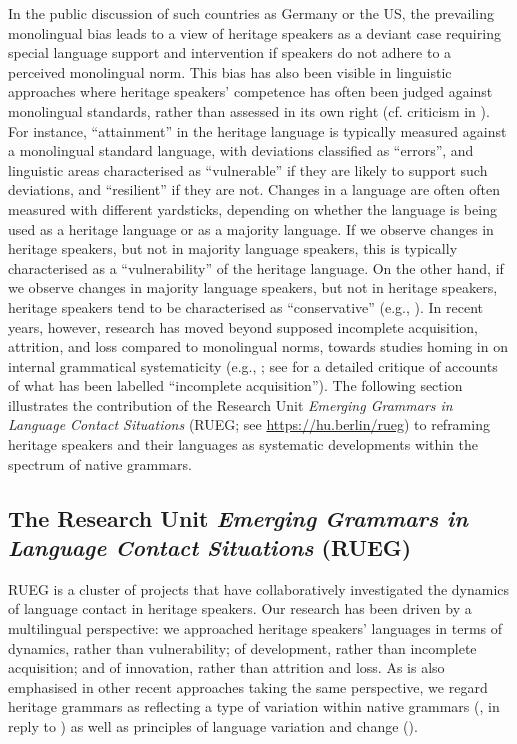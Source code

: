 \documentclass[output=paper,colorlinks,citecolor=brown]{langscibook}
\begin{document}
In the public discussion of such countries as Germany or the US, the prevailing monolingual bias leads to a view of heritage speakers as a deviant case requiring special language support and intervention if speakers do not adhere to a perceived monolingual norm. This bias has also been visible in linguistic approaches where heritage speakers’ competence has often been judged against monolingual standards, rather than assessed in its own right (cf. criticism in \citealt{RothmanEtAl2022}). For instance, “attainment” in the heritage language is typically measured against a monolingual standard language, with deviations classified as “errors”, and linguistic areas characterised as “vulnerable” if they are likely to support such deviations, and “resilient” if they are not. Changes in a language are often often measured with different yardsticks, depending on whether the language is being used as a heritage language or as a majority language. If we observe changes in heritage speakers, but not in majority language speakers, this is typically characterised as a “vulnerability” of the heritage language. On the other hand, if we observe changes in majority language speakers, but not in heritage speakers, heritage speakers tend to be characterised as “conservative” (e.g., \citealt{Montrul2015}). In recent years, however, research has moved beyond supposed incomplete acquisition, attrition, and loss compared to monolingual norms, towards studies homing in on internal grammatical systematicity (e.g., \citealt{Grosjean2008, PascualRothman2012, RothmanTreffers-Daller2014, Guijarro-FuentesSchmitz2015, ScontrasEtAl2015, Schroeder2016, TsehayeEtAl2021, ZubanEtAl2021, WieseEtAl2022, AlexiadouRizou2023, AlexiadouEtAl2023, ÖzsoyBlum2023, Bunketal_ip_a, Bunketal_ip_b, Keskinetal_ir}; see \citealt{KupischRothman2018} for a detailed critique of accounts of what has been labelled “incomplete acquisition”). The following section illustrates the contribution of the Research Unit \textit{Emerging Grammars in Language Contact Situations} (RUEG; see \url{https://hu.berlin/rueg}) to reframing heritage speakers and their languages as systematic developments within the spectrum of native grammars.

\subsection{The Research Unit \textit{Emerging Grammars in Language Contact Situations} (RUEG)} \label{sec:introwieseetal:RUEG}

RUEG is a cluster of projects that have collaboratively investigated the dynamics of language contact in heritage speakers. Our research has been driven by a multilingual perspective: we approached heritage speakers’ languages in terms of dynamics, rather than vulnerability; of development, rather than incomplete acquisition; and of innovation, rather than attrition and loss. As is also emphasised in other recent approaches taking the same perspective, we regard heritage grammars as reflecting a type of variation within native grammars (\citealt{ScontrasEtAl2018, EmbickEtAl2020, FloresRinke2020}, in reply to \citealt{PolinskyScontras2020}) as well as principles of language variation and change (\citealt{Johannessen2018, AalberseEtAl2019, LohndalEtAl2019, Muysken2020}).
\end{document}
